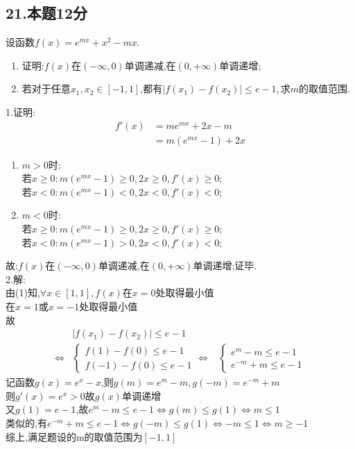\documentclass[UTF8]{ctexart}
\begin{document}
\subsection{21.本题12分}
设函数$f(x)=e^{mx}+x^2-mx.$\\
\begin{enumerate}
    \item 证明:$f(x)$在$(-\infty,0)$单调递减,在$(0,+\infty)$单调递增;
    \item 若对于任意$x_1,x_2\in [-1,1]$,都有$|f(x_1)-f(x_2)|\leq e-1,$求$m$的取值范围.
\end{enumerate}
1.证明:\\
\[
\begin{aligned}
    f'(x)&=me^{mx}+2x-m\\
    &=m(e^{mx}-1)+2x
\end{aligned}\]
\begin{enumerate}
    \item $m> 0$时:\\
    若$x\geq 0:m(e^{mx}-1)\geq 0,2x\geq 0,f'(x)\geq 0$;\\
    若$x<0:m(e^{mx}-1)<0,2x<0,f'(x)<0$;\\
    \item $m<0$时:\\
    若$x\geq 0:m(e^{mx}-1)\geq 0,2x\geq 0,f'(x)\geq 0$;\\
    若$x<0:m(e^{mx}-1)>0,2x<0,f'(x)<0$;\\
\end{enumerate}
故:$f(x)$在$(-\infty,0)$单调递减,在$(0,+\infty)$单调递增;证毕.\\
2.解:\\
由(1)知,$\forall x \in [1,1],f(x)$在$x=0$处取得最小值\\
在$x=1$或$x=-1$处取得最小值\\
故\[
\begin{aligned}
    &|f(x_1)-f(x_2)|\leq e-1\\
    \Leftrightarrow &\left\{
        \begin{aligned}
            f(1)-f(0)\leq e-1\\
            f(-1)-f(0)\leq e-1
        \end{aligned}
    \right.
    \Leftrightarrow &\left\{
        \begin{aligned}
            e^m-m\leq e-1\\
            e^{-m}+m\leq e-1
        \end{aligned}
    \right.
\end{aligned}\]
记函数$g(x)=e^x-x$,则$g(m)=e^m-m,g(-m)=e^{-m}+m$\\
则$g'(x)=e^x>0$故$g(x)$单调递增\\
又$g(1)=e-1$,故$e^m-m\leq e-1 \Leftrightarrow g(m)\leq g(1)\Leftrightarrow m\leq 1$\\
类似的,有$e^{-m}+m\leq e-1 \Leftrightarrow g(-m)\leq g(1)
\Leftrightarrow -m\leq 1 \Leftrightarrow m\geq -1$\\
综上,满足题设的m的取值范围为$[-1,1]$
\end{document}
